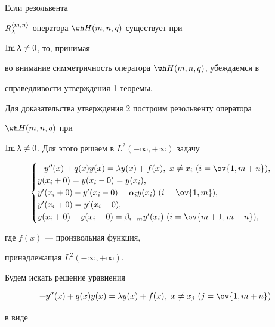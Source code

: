 \begin{pf} 


Если резольвента 


$R^{\langle m,n\rangle}_\lambda$ оператора $\wh H(m,n,q)$ существует при 


$\operatorname{Im}\lambda\ne 0$, то, принимая 


во внимание симметричность оператора $\wh H(m,n,q)$, убеждаемся в 


справедливости утверждения 1 теоремы. 


 


Для доказательства утверждения 2 построим резольвенту оператора 


$\wh H(m,n,q)$ при 


$\operatorname{Im}\lambda\ne 0$. Для этого решаем в $L^2(-\infty,+\infty)$ задачу 


\begin{equation} 


\begin{cases} 


-y''(x)+q(x)y(x)=\lambda y(x)+f(x), \ x\ne x_i \ (i=\ov{1,m+n}),\\ 


y(x_i+0)=y(x_i-0)=y(x_i), \\ 


y'(x_i+0)-y'(x_i-0)=\alpha_i y(x_i) \ (i=\ov{1,m}), \\ 


y'(x_i+0)=y'(x_i-0), \\ 


y(x_i+0)-y(x_i-0)=\beta_{i-m}y'(x_i) \ (i=\ov{m+1,m+n}), 


\end{cases} 


\end{equation} 


где $f(x)$ --- произвольная функция, 


принадлежащая $L^2(-\infty,+\infty)$. 


 


Будем искать решение уравнения 


\begin{equation} 


-y''(x)+q(x)y(x)=\lambda y(x)+f(x), \ x\ne x_j \ (j=\ov{1,m+n}) 


\end{equation} 


в виде 


$$ 



\end{pf}
